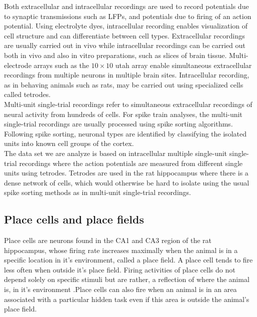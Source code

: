 Both extracellular and intracellular recordings are used to record potentials due to synaptic transmissions such as LFPs, and potentials due to firing of an action potential. Using electrolyte dyes, intracellular recording enables visualization
of cell structure and can differentiate between cell types.
Extracellular recordings are usually carried out in vivo while intracellular recordings can be carried out both in vivo and also in vitro preparations, such as slices of brain tissue. Multi-electrode arrays such as the $10 \times 10$ utah array enable simultaneous extracellular recordings from  multiple neurons in multiple brain sites. Intracellular recording, as in behaving animals such as rats, may be carried out using specialized cells called tetrodes.\\
Multi-unit single-trial recordings refer to simultaneous  extracellular recordings of neural activity from hundreds of cells.
For spike train analyses, the multi-unit single-trial recordings are usually processed using  spike sorting algorithms. Following spike sorting, neuronal types are identified by classifying the isolated units into known cell groups of the cortex.\\

The data set we are analyze is based on intracellular multiple single-unit single-trial recordings where the action potentials are measured from different single units using tetrodes. Tetrodes are used in the rat hippocampus where there is a dense network of cells, which would otherwise be hard to isolate using the usual spike sorting methods as in multi-unit single-trial recordings.


\subsection{Place cells and place fields}
Place cells are neurons found in the CA1 and CA3 region of the rat hippocampus,
whose firing rate increases maximally when the animal is in a specific location
in it's environment, called a place field. A place cell tends to fire less often when outside it's place field. Firing activities of place cells do not depend solely on specific stimuli but are rather, a reflection of where the animal is, in it's environment \cite{OKeefe1971}.Place cells can also fire when an animal 
is in an area associated with a particular hidden task even if this area
is outside the animal's place field.


